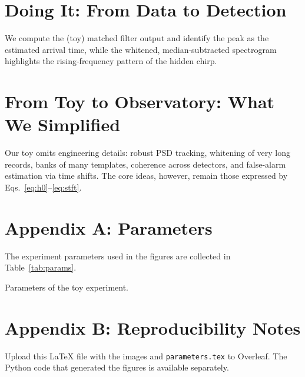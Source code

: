 \documentclass[11pt,a4paper]{article}
\begin{document}
\section{Doing It: From Data to Detection}
We compute the (toy) matched filter output and identify the peak as the estimated arrival time, while the whitened, median-subtracted spectrogram highlights the rising-frequency pattern of the hidden chirp.

\section{From Toy to Observatory: What We Simplified}
Our toy omits engineering details: robust PSD tracking, whitening of very long records, banks of many templates, coherence across detectors, and false-alarm estimation via time shifts. The core ideas, however, remain those expressed by Eqs.~\eqref{eq:h0}--\eqref{eq:stft}.

\appendix
\section*{Appendix A: Parameters}
\noindent The experiment parameters used in the figures are collected in Table~\ref{tab:params}.
\begin{table}[h!]\centering
\caption{Parameters of the toy experiment.}
\label{tab:params}

\end{table}

\section*{Appendix B: Reproducibility Notes}
Upload this \LaTeX{} file with the images and \texttt{parameters.tex} to Overleaf. The Python code that generated the figures is available separately.
\end{document}
